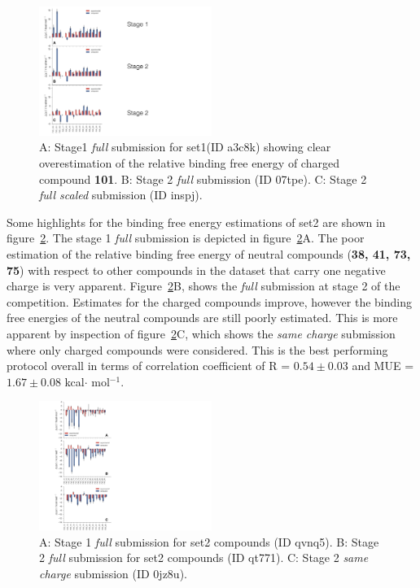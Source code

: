 \documentclass{svjour3}                     %
\begin{document}
\begin{figure}
\includegraphics[width=0.5\textwidth]{Fig3.pdf}
\caption{A: Stage1 \textit{full} submission for set1(ID a3c8k) showing clear overestimation of the relative binding free energy of charged compound \textbf{101}. B: Stage 2 \textit{full} submission (ID 07tpe). C: Stage 2 \textit{full scaled} submission (ID inspj).}
\label{fig:fig3}
\end{figure}

%
Some highlights for the binding free energy estimations of set2 are shown in figure~\ref{fig:fig4}. The stage 1 \textit{full} submission is depicted in figure~\ref{fig:fig4}A. The poor estimation of the relative binding free energy of neutral compounds (\textbf{38, 41, 73, 75}) with respect to other compounds in the dataset that carry one negative charge is very apparent. Figure~\ref{fig:fig4}B, shows the \textit{full} submission at stage 2 of the competition.  Estimates for the charged compounds improve, however the binding free energies of the neutral compounds are still poorly estimated. This is more apparent by inspection of figure~\ref{fig:fig4}C, which shows the \textit{same charge} submission  where only charged compounds were considered. This is the best performing protocol overall in terms of correlation coefficient of R = $0.54\pm0.03$  and MUE = $1.67\pm0.08$ kcal$\cdot$ mol$^{-1}$.

\begin{figure}
\includegraphics[width=0.5\textwidth]{Fig4.pdf}
\caption{A: Stage 1 \textit{full} submission for set2 compounds (ID qvnq5). B: Stage 2 \textit{full} submission for set2 compounds (ID qt771). C: Stage 2 \textit{same charge} submission (ID 0jz8u).}
\label{fig:fig4}
\end{figure}
\end{document}
